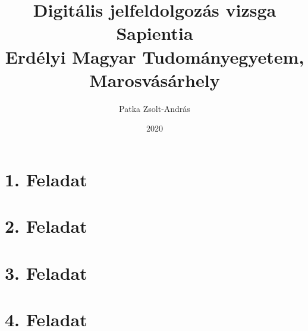 \documentclass[12pt]{article}
\title{
	{Digitális jelfeldolgozás vizsga}\\
	{\large Sapientia\\
	Erdélyi Magyar Tudományegyetem, Marosvásárhely}
}
\author{Patka Zsolt-András}
\date{2020}
\begin{document}
\maketitle
{}

\tableofcontents
\listoffigures



\section{1. Feladat}


\section{2. Feladat}


\section{3. Feladat}


\section{4. Feladat}


\appendix

\end{document}
